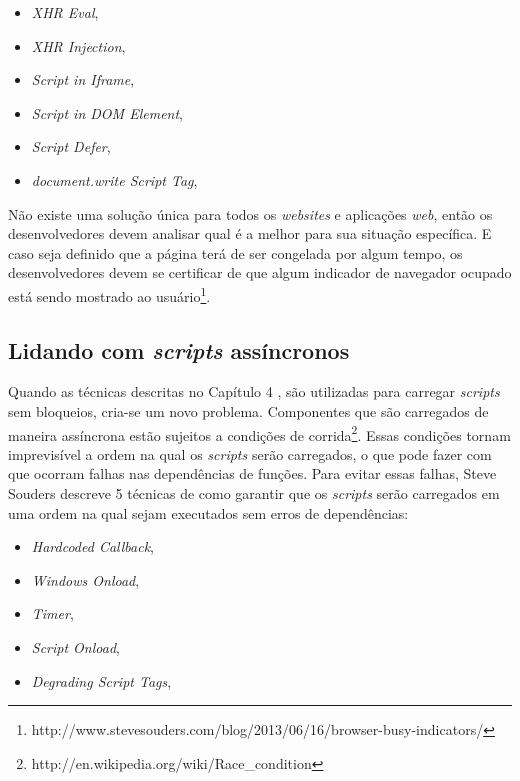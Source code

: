 \begin{itemize}
	\item \textit{XHR Eval}, \cite[p.~29]{EvenFaster}
	\item \textit{XHR Injection}, \cite[p.~31]{EvenFaster}
	\item \textit{Script in Iframe}, \cite[p.~31]{EvenFaster}
	\item \textit{Script in DOM Element}, \cite[p.~32]{EvenFaster}
	\item \textit{Script Defer}, \cite[p.~32]{EvenFaster}
	\item \textit{document.write Script Tag}, \cite[p.~33]{EvenFaster}
\end{itemize}

Não existe uma solução única para todos os \textit{websites} e aplicações \textit{web}, então os desenvolvedores devem analisar qual é a melhor para sua situação específica. E caso seja definido que a página terá de ser congelada por algum tempo, os desenvolvedores devem se certificar de que algum indicador de navegador ocupado está sendo mostrado ao usuário\footnote{http://www.stevesouders.com/blog/2013/06/16/browser-busy-indicators/}.

\subsection{Lidando com \textit{scripts} assíncronos}
\label{subsec:evenfaster_cap5}
Quando as técnicas descritas no Capítulo 4 \cite[p.~27]{EvenFaster}, são utilizadas para carregar \textit{scripts} sem bloqueios, cria-se um novo problema. Componentes que são carregados de maneira assíncrona estão sujeitos a condições de corrida\footnote{http://en.wikipedia.org/wiki/Race\_condition}. Essas condições tornam imprevisível a ordem na qual os \textit{scripts} serão carregados, o que pode fazer com que ocorram falhas nas dependências de funções. Para evitar essas falhas, Steve Souders descreve 5 técnicas de como garantir que os \textit{scripts} serão carregados em uma ordem na qual sejam executados sem erros de dependências:

\begin{itemize}
	\item \textit{Hardcoded Callback}, \cite[p.~46]{EvenFaster}
	\item \textit{Windows Onload}, \cite[p.~47]{EvenFaster}
	\item \textit{Timer}, \cite[p.~48]{EvenFaster}
	\item \textit{Script Onload}, \cite[p.~49]{EvenFaster}
	\item \textit{Degrading Script Tags}, \cite[p.~50]{EvenFaster}
\end{itemize}

